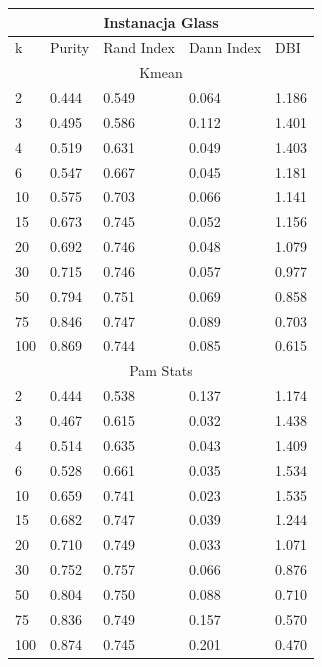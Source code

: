 \documentclass[12pt,a4paper]{article}
\begin{document}
\begin{tabular}{ |p{1.5cm}||p{2.5cm}|p{2.5cm}|p{2.5cm}|p{2.5cm}| }
\hline
\multicolumn{5}{|c|}{Instanacja Glass}\\
\hline
k &Purity & Rand Index & Dann Index & DBI \\
\hline
\hline
\multicolumn{5}{|c|}{Kmean}\\
\hline
2 & 0.444 & 0.549 & 0.064 & 1.186\\
3 & 0.495 & 0.586 & 0.112 & 1.401\\
4 & 0.519 & 0.631 & 0.049 & 1.403\\
6 & 0.547 & 0.667 & 0.045 & 1.181\\
10 & 0.575 & 0.703 & 0.066 & 1.141\\
15 & 0.673 & 0.745 & 0.052 & 1.156\\
20 & 0.692 & 0.746 & 0.048 & 1.079\\
30 & 0.715 & 0.746 & 0.057 & 0.977\\
50 & 0.794 & 0.751 & 0.069 & 0.858\\
75 & 0.846 & 0.747 & 0.089 & 0.703\\
100 & 0.869 & 0.744 & 0.085 & 0.615\\
\hline
\multicolumn{5}{|c|}{Pam Stats}\\
\hline
2 & 0.444 & 0.538 & 0.137 & 1.174\\
3 & 0.467 & 0.615 & 0.032 & 1.438\\
4 & 0.514 & 0.635 & 0.043 & 1.409\\
6 & 0.528 & 0.661 & 0.035 & 1.534\\
10 & 0.659 & 0.741 & 0.023 & 1.535\\
15 & 0.682 & 0.747 & 0.039 & 1.244\\
20 & 0.710 & 0.749 & 0.033 & 1.071\\
30 & 0.752 & 0.757 & 0.066 & 0.876\\
50 & 0.804 & 0.750 & 0.088 & 0.710\\
75 & 0.836 & 0.749 & 0.157 & 0.570\\
100 & 0.874 & 0.745 & 0.201 & 0.470\\
\hline
\end{tabular}
\end{document}
